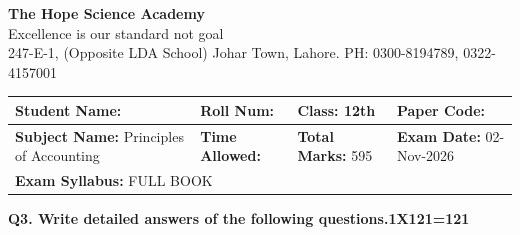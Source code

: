 \documentclass[11pt,a4paper]{article}
\begin{document}
\begin{center}
  {\Huge\bfseries The Hope Science Academy}\\[3pt]
  {\small Excellence is our standard not goal}\\[2pt]
  {\small 247-E-1, (Opposite LDA School) Johar Town, Lahore. PH: 0300-8194789, 0322-4157001}
\end{center}

\medskip
\noindent
\begin{tabularx}{\linewidth}{|X|X|X|X|}
\hline
\textbf{Student Name:} & \textbf{Roll Num:} & \textbf{Class:} 12th & \textbf{Paper Code:} \\ \hline
\textbf{Subject Name:} Principles of Accounting & \textbf{Time Allowed:} & \textbf{Total Marks:} 595 & \textbf{Exam Date:} 02-Nov-2026 \\ \hline
\multicolumn{4}{|l|}{\textbf{Exam Syllabus:} FULL BOOK} \\ \hline
\end{tabularx}

\bigskip
\noindent\textbf{Q3. Write detailed answers of the following questions.}\hfill\textbf{1X121=121}
\end{document}

